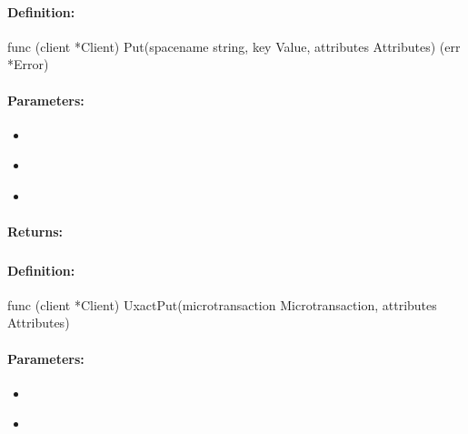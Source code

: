 \paragraph{Definition:}
\begin{gocode}
func (client *Client) Put(spacename string, key Value, attributes Attributes) (err *Error)
\end{gocode}

\paragraph{Parameters:}
\begin{itemize}[noitemsep]
\item {}\\

\item {}\\

\item {}\\

\end{itemize}

\paragraph{Returns:}


\pagebreak
\subsubsection{}
\label{api:Go:UxactPut}


\paragraph{Definition:}
\begin{gocode}
func (client *Client) UxactPut(microtransaction Microtransaction, attributes Attributes)
\end{gocode}

\paragraph{Parameters:}
\begin{itemize}[noitemsep]
\item {}\\

\item {}\\

\end{itemize}

